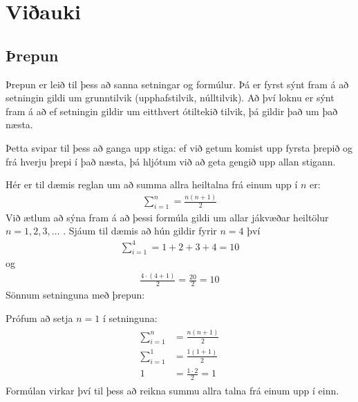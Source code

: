 \documentclass[a4paper,10pt,icelandic]{sphinxmanual}
\begin{document}
\chapter{Viðauki}
\label{\detokenize{Kafli12:viauki}}\label{\detokenize{Kafli12::doc}}

\section{Þrepun}
\label{\detokenize{Kafli12:repun}}
Þrepun er leið til þess að sanna setningar og formúlur.
Þá er fyrst sýnt fram á að setningin gildi um grunntilvik (upphafstilvik, núlltilvik).
Að því loknu er sýnt fram á að ef setningin gildir um eitthvert ótiltekið tilvik, þá gildir það um það næsta.

Þetta svipar til þess að ganga upp stiga: ef við getum komist upp fyrsta þrepið og frá hverju þrepi í það næsta, þá hljótum við að geta gengið upp allan stigann.

\begin{figure}[htbp]
\centering

\noindent{}
\end{figure}

Hér er til dæmis reglan um að summa allra heiltalna frá einum upp í \(n\) er:
\begin{equation*}
\begin{split}\sum_{i=1}^n = \frac{n(n+1)}{2}\end{split}
\end{equation*}
Við ætlum að sýna fram á að þessi formúla gildi um allar jákvæðar heiltölur \(n=1,2,3, \dots\) .
Sjáum til dæmis að hún gildir fyrir \(n=4\) því
\begin{equation*}
\begin{split}\sum_{i=1}^4 = 1+2+3+4 = 10\end{split}
\end{equation*}
og
\begin{equation*}
\begin{split}\frac{4\cdot(4+1)}{2} = \frac{20}{2} = 10\end{split}
\end{equation*}
Sönnum setninguna með þrepun:


Prófum að setja \(n=1\) í setninguna:
\begin{equation*}
\begin{split}\begin{aligned}
  \sum_{i=1}^n &= \frac{n(n+1)}{2}\\
  \sum_{i=1}^1 &= \frac{1(1+1)}{2}\\
  1&=\frac{1\cdot2}{2}=1
\end{aligned}\end{split}
\end{equation*}
Formúlan virkar því til þess að reikna summu allra talna frá einum upp í einn.
\end{document}
